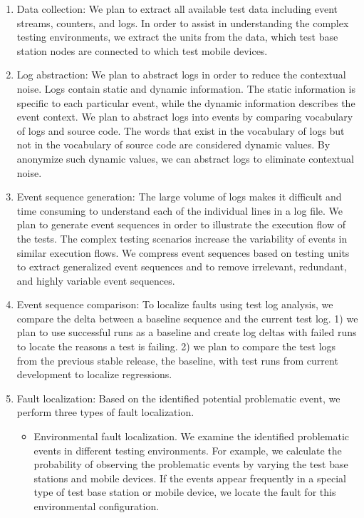 \begin{enumerate}

\item Data collection: We plan to extract all available test data including event streams, counters, and logs. In order to assist in understanding the complex testing environments, we extract the units from the data, \ie which test base station nodes are connected to which test mobile devices.

\item Log abstraction: We plan to abstract logs in order to reduce the contextual noise. Logs contain static and dynamic information. The static information is specific to each particular event, while the dynamic information describes the event context. We plan to abstract logs into events by comparing vocabulary of logs and source code. The words that exist in the vocabulary of logs but not in the vocabulary of source code are considered dynamic values. By anonymize such dynamic values, we can abstract logs to eliminate contextual noise.

\item Event sequence generation: The large volume of logs makes it difficult
and time consuming to understand each of the individual lines in a log file. We
plan to generate event sequences in order to illustrate the execution flow of
the tests. The complex testing scenarios increase the variability of events in
similar execution flows. We compress event sequences based on testing units
to extract generalized event sequences and to remove irrelevant, redundant, and
highly variable event sequences.

\item Event sequence comparison: To localize faults using test log analysis, we compare the delta between a baseline sequence and the current test log. 1) we plan to use successful runs as a baseline and create log deltas with failed runs to locate the reasons a test is failing. 2) we plan to compare the test logs from the previous stable release, the baseline, with test runs from current development to localize regressions.

\item Fault localization: Based on the identified potential problematic event, we perform three types of fault localization. 
	\begin{itemize}
		\item Environmental fault localization. We examine the identified problematic events in different testing environments. For example, we calculate the probability of observing the problematic events by varying the test base stations and mobile devices. If the events appear frequently in a special type of test base station or mobile device, we locate the fault for this environmental configuration.
		

\end{itemize}
\end{enumerate}
